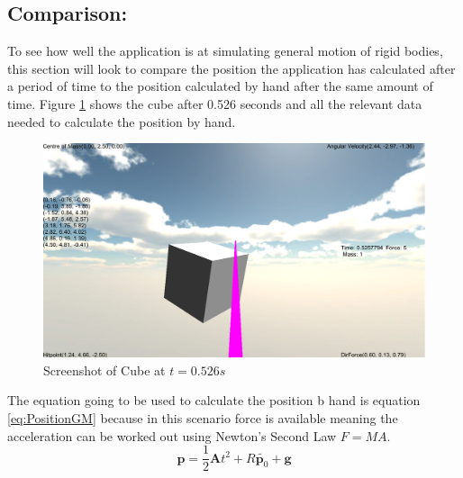 \subsection{Comparison:}\label{sc:Comp}
To see how well the application is at simulating general motion of rigid bodies, this section will look to compare the position the application has calculated after a period of time to the position calculated by hand after the same amount of time.
Figure \ref{fig:ScreenShotSingle} shows the cube after 0.526 seconds and all the relevant data needed to calculate the position by hand.
\begin{figure}[h!]
	\centering
	\includegraphics[width=\textwidth]{images/Screenshot2.PNG}
	\caption{Screenshot of Cube at $t = 0.526 s$}
	\label{fig:ScreenShotSingle}
\end{figure}

The equation going to be used to calculate the position b hand is equation \ref{eq:PositionGM} because in this scenario force is available meaning the acceleration can be worked out using Newton's Second Law $F=MA$.
\begin{equation}\label{eq:PositionGM}
\mathbf{p}=\frac{1}{2}\mathbf{A}t^{2}+{R}\tilde{\mathbf{p}_{0}}+\mathbf{g}
\end{equation}

